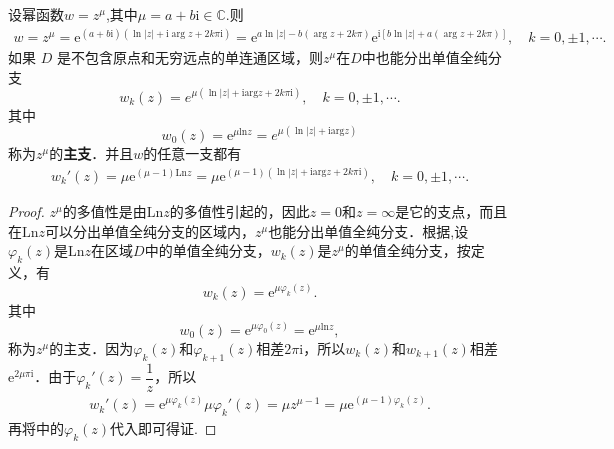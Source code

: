\documentclass[../../main.tex]{subfiles}%
\begin{document}
\begin{theorem}\label{theorem:复变函数--幂函数的基本性质}
设幂函数$w=z^\mu$,其中$\mu=a+b\mathrm{i}\in \mathbb{C}$.则
\begin{align*}
w = z^\mu = \text{e}^{(a + b\text{i})(\ln |z| + \text{i}\arg z + 2k\pi \text{i})}
= \text{e}^{a\ln |z| - b(\arg z + 2k\pi)} \text{e}^{\text{i}[b\ln |z| + a(\arg z + 2k\pi)]},\quad
k = 0, \pm 1, \cdots.
\end{align*}
如果 \( D \) 是不包含原点和无穷远点的单连通区域，则$z^\mu$在$D$中也能分出单值全纯分支
\[
w_k(z)=e^{\mu (\ln \left| z \right|+\mathrm{iarg}z+2k\pi \mathrm{i})},\quad k=0,\pm 1,\cdots .
\]
其中
\[
w_0(z) = \text{e}^{\mu  \mathrm{ln} z}=e^{\mu (\ln \left| z \right|+\mathrm{iarg}z)}
\]
称为$z^\mu$的\textbf{主支}．并且$w$的任意一支都有
\begin{align}\label{equation:幂函数求导}
w_k'(z) =\mu \mathrm{e}^{\left( \mu -1 \right) \mathrm{Ln}z}=\mu \mathrm{e}^{(\mu -1)(\ln \left| z \right|+\mathrm{iarg}z+2k\pi \mathrm{i})},\quad k=0,\pm 1,\cdots .
\end{align}
\end{theorem}
\begin{proof}

$z^\mu$的多值性是由$\mathrm{Ln} z$的多值性引起的，因此$z = 0$和$z = \infty$是它的支点，而且在$\mathrm{Ln} z$可以分出单值全纯分支的区域内，$z^\mu$也能分出单值全纯分支．根据,设$\varphi_k(z)$是$\mathrm{Ln} z$在区域$D$中的单值全纯分支，$w_k(z)$是$z^\mu$的单值全纯分支，按定义，有
\[
w_k(z) = \text{e}^{\mu \varphi_k(z)}.
\]
其中
\[
w_0(z) = \text{e}^{\mu \varphi_0(z)} = \text{e}^{\mu  \mathrm{ln} z},
\]
称为$z^\mu$的主支．因为$\varphi_k(z)$和$\varphi_{k + 1}(z)$相差$2\pi \text{i}$，所以$w_k(z)$和$w_{k + 1}(z)$相差$\text{e}^{2\mu \pi \text{i}}$．由于$\varphi_k'(z) = \dfrac{1}{z}$，所以
\begin{align*}
w_k'(z) = \text{e}^{\mu \varphi_k(z)} \mu \varphi_k'(z)
= \mu z^{\mu - 1}
= \mu \text{e}^{(\mu - 1)\varphi_k(z)}.
\end{align*}
再将中的$\varphi_k(z)$代入即可得证.

\end{proof}
\end{document}
